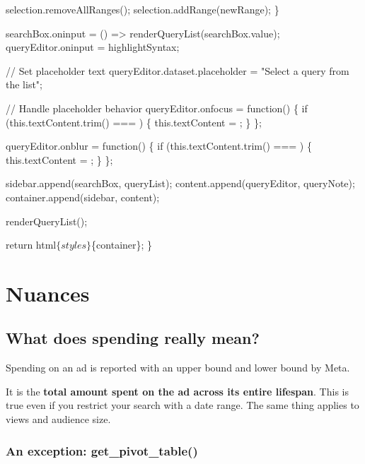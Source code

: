 \documentclass[
  letterpaper,
  DIV=11,
  numbers=noendperiod]{scrreprt}
\newenvironment{Shaded}{\begin{snugshade}}{\end{snugshade}}
\newcommand{\NormalTok}[1]{\textcolor[rgb]{0.00,0.23,0.31}{#1}}
\begin{document}
\begin{Shaded}
\begin{Highlighting}[]
\NormalTok{    selection.removeAllRanges();}
\NormalTok{    selection.addRange(newRange);}
\NormalTok{  \}}

\NormalTok{  searchBox.oninput = () =\textgreater{} renderQueryList(searchBox.value);}
\NormalTok{  queryEditor.oninput = highlightSyntax;}

\NormalTok{  // Set placeholder text}
\NormalTok{  queryEditor.dataset.placeholder = "Select a query from the list";}

\NormalTok{  // Handle placeholder behavior}
\NormalTok{  queryEditor.onfocus = function() \{}
\NormalTok{    if (this.textContent.trim() === \textquotesingle{}\textquotesingle{}) \{}
\NormalTok{      this.textContent = \textquotesingle{}\textquotesingle{};}
\NormalTok{    \}}
\NormalTok{  \};}

\NormalTok{  queryEditor.onblur = function() \{}
\NormalTok{    if (this.textContent.trim() === \textquotesingle{}\textquotesingle{}) \{}
\NormalTok{      this.textContent = \textquotesingle{}\textquotesingle{};}
\NormalTok{    \}}
\NormalTok{  \};}

\NormalTok{  sidebar.append(searchBox, queryList);}
\NormalTok{  content.append(queryEditor, queryNote);}
\NormalTok{  container.append(sidebar, content);}

\NormalTok{  renderQueryList();}
  
\NormalTok{  return html\textasciigrave{}$\{styles\}$\{container\}\textasciigrave{};}
\NormalTok{\}}
\end{Highlighting}
\end{Shaded}


\chapter{Nuances}\label{sec-nuances}

\section{What does spending really mean?}\label{sec-spending}

Spending on an ad is reported with an upper bound and lower bound by
Meta.

It is the \textbf{total amount spent on the ad across its entire
lifespan}. This is true even if you restrict your search with a date
range. The same thing applies to views and audience size.

\subsection{An exception:
get\_pivot\_table()}\label{an-exception-get_pivot_table}
\end{document}
